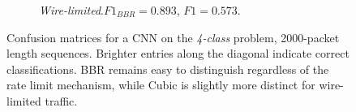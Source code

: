 \begin{figure}
    \centering
    \begin{subfigure}[b]{0.49\linewidth}
    \centering
    \label{fig:4c-cnn-conf-app}
    \end{subfigure}%
    \begin{subfigure}[b]{0.49\linewidth}
    \centering
    \hspace{-1.5em}
    \caption{\emph{Wire-limited}.\newline ${\mathit{F1}_\mathit{BBR}=\num{0.893}}$, ${\mathit{F1}=\num{0.573}}$. 
    }
    \label{fig:4c-cnn-conf-tc}
    \end{subfigure}
    
    \caption{Confusion matrices for a CNN on the \emph{4-class} problem, \num{2000}-packet length sequences. Brighter entries along the diagonal indicate correct classifications. BBR remains easy to distinguish regardless of the rate limit mechanism, while Cubic is slightly more distinct for wire-limited traffic.}
    \label{fig:4c-cnn-conf}
\end{figure}

